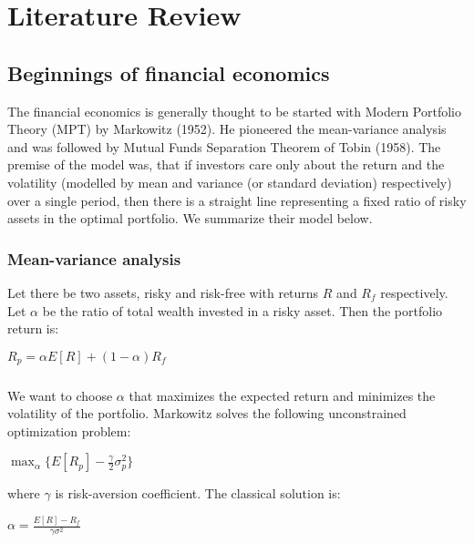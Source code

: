 \chapter{Literature Review}
\label{litreview}

\section{Beginnings of financial economics}

The financial economics is generally thought to be started with Modern Portfolio Theory (MPT) by Markowitz (1952). He pioneered the mean-variance analysis and was followed by Mutual Funds Separation Theorem of Tobin (1958). The premise of the model was, that if investors care only about the return and the volatility (modelled by mean and variance (or standard deviation) respectively) over a single period, then there is a straight line representing a fixed ratio of risky assets in the optimal portfolio. We summarize their model below.

\subsection{Mean-variance analysis}
Let there be two assets, risky and risk-free with returns $R$ and $R_f$ respectively. Let $\alpha$ be the ratio of total wealth invested in a risky asset. Then the portfolio return is:

\begin{center}
  $R_p = \alpha E[R] + \left(1-\alpha \right) R_f$
\end{center}

\paragraph{}We want to choose $\alpha$ that maximizes the expected return and minimizes the volatility of the portfolio. Markowitz solves the following unconstrained optimization problem:

\begin{center}
  $\displaystyle\max_{\alpha} \{ E[R_p] - \frac{\gamma}{2}\sigma^2_p \}$
\end{center}

where $\gamma$ is risk-aversion coefficient. The classical solution is:

\begin{center}
	$\alpha = \frac{E[R] - R_f}{\gamma\sigma^2}$
\end{center}

